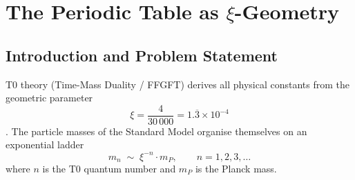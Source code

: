 
\chapter{The Periodic Table as \texorpdfstring{$\xi$}{xi}-Geometry}
\label{chap:periodic-xi}

\begin{abstract}
The periodic table of the elements and the particle-mass ladder of T0 theory
share the same geometric quantum number~$n$, but in different roles.
Particle masses follow a \emph{radial} exponential scaling
$m_n \sim \xi^{-n} \cdot m_P$, while the shell structure of the periodic table
obeys an \emph{angular} quadratic degeneracy $g_n = 2n^2$.
Both arise from the three-dimensional lattice geometry of T0 theory:
$\xi$ is the packing deficit of the 3D lattice (radial direction),
$2n^2$ is the degeneracy of the $n$-th spherical shell in the same lattice
(angular direction).
The Rydberg energy lies exactly on rung~7 of the $\xi$-power ladder:
$R_\infty = \frac{m_e \alpha^2}{2} \approx \xi^{6.956} \cdot E_P$.
The duality principle $E_n \cdot g_n = 2R_\infty = \text{const}$
connects the $1/n^2$ energy ladder with the $n^2$ filling ladder
and is a geometric equipartition.
The periodic table is the angular cross-section of the $\xi$-geometry at
rung $\xi^{\sim 7}$ — analogously, the lepton masses are the radial cross-section
at rungs $\xi^{4.9}$–$\xi^{5.8}$.
\end{abstract}

\section{Introduction and Problem Statement}
\label{sec:intro}

T0 theory (Time-Mass Duality / FFGFT) derives all physical constants from the
geometric parameter
\begin{equation}
  \xi = \frac{4}{30\,000} = 1.\overline{3} \times 10^{-4}
\end{equation}
\cite{dok009,dok041,dok056}.
The particle masses of the Standard Model organise themselves on an exponential
ladder
\begin{equation}
  m_n \;\sim\; \xi^{-n} \cdot m_P, \qquad n = 1, 2, 3, \ldots
  \label{eq:massldr}
\end{equation}
where $n$ is the T0 quantum number and $m_P$ is the Planck mass.

